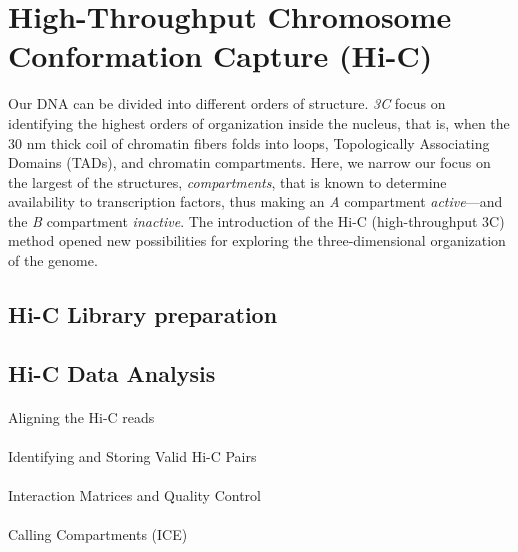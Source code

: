 \documentclass[
  11pt,
  a4paper,
]{scrbook}
\makeatletter
\let\oldparagraph\paragraph
\renewcommand{\paragraph}{
    \@ifstar
      \xxxParagraphStar
      \xxxParagraphNoStar
  }
\newcommand{\xxxParagraphStar}[1]{\oldparagraph*{#1}\mbox{}}
\newcommand{\xxxParagraphNoStar}[1]{\oldparagraph{#1}\mbox{}}
\let\oldemph\emph
\renewcommand\emph[1]{\oldemph{\color{gray}#1}}
\makeatother
\begin{document}
\section{High-Throughput Chromosome Conformation Capture
(Hi-C)}\label{high-throughput-chromosome-conformation-capture-hi-c}

Our DNA can be divided into different orders of structure. \emph{3C}
focus on identifying the highest orders of organization inside the
nucleus, that is, when the 30 nm thick coil of chromatin fibers folds
into loops, Topologically Associating Domains (TADs), and chromatin
compartments. Here, we narrow our focus on the largest of the
structures, \emph{compartments}, that is known to determine availability
to transcription factors, thus making an \emph{A} compartment
\emph{active}---and the \emph{B} compartment \emph{inactive}. The
introduction of the Hi-C (high-throughput 3C) method
\citep{lieberman_aiden_comprehensive_2009} opened new possibilities for
exploring the three-dimensional organization of the genome.

\subsection{Hi-C Library preparation}\label{hi-c-library-preparation}

\subsection{Hi-C Data Analysis}\label{hi-c-data-analysis}

\paragraph{Aligning the Hi-C reads}\label{aligning-the-hi-c-reads}

\paragraph{Identifying and Storing Valid Hi-C
Pairs}\label{identifying-and-storing-valid-hi-c-pairs}

\paragraph{Interaction Matrices and Quality
Control}\label{interaction-matrices-and-quality-control}

\paragraph{Calling Compartments (ICE)}\label{calling-compartments-ice}
\end{document}
